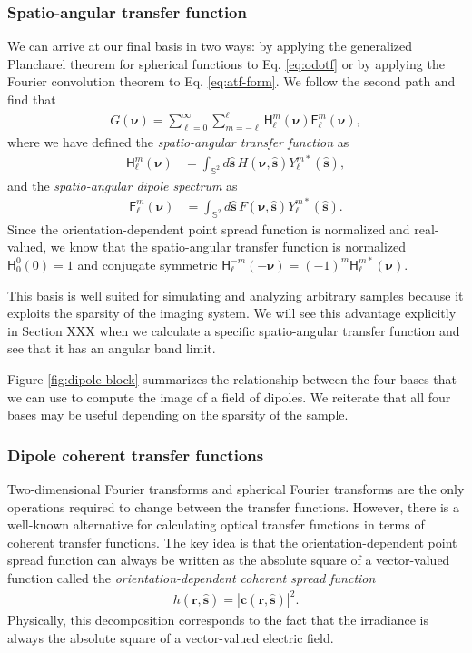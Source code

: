 \documentclass[]{osa-article}
\providecommand{\mb}[1]{\mathbf{#1}}
\providecommand{\msf}[1]{\mathsf{#1}}
\providecommand{\mh}[1]{\mathbf{\hat{#1}}}
\providecommand{\mbb}[1]{\mathbb{#1}}
\providecommand{\bs}[1]{\boldsymbol{#1}}
\providecommand{\lmsum}{\sum_{\ell=0}^\infty\sum_{m=-\ell}^{\ell}}
\begin{document}
\subsubsection{Spatio-angular transfer function}
We can arrive at our final basis in two ways: by applying the generalized
Plancharel theorem for spherical functions to Eq. \ref{eq:odotf} or by applying
the Fourier convolution theorem to Eq. \ref{eq:atf-form}. We follow the
second path and find that
\begin{align}
G(\bs{\nu}) = \lmsum \msf{H}_\ell^m(\bs{\nu})\msf{F}_\ell^m(\bs{\nu}) \label{eq:saft},
\end{align}
where we have defined the \textit{spatio-angular transfer function} as
  \begin{align}
  \msf{H}_\ell^m(\bs{\nu}) &= \int_{\mbb{S}^2}d\mh{s}\, H(\bs{\nu}, \mh{s})Y_\ell^{m*}(\mh{s}),
  \end{align}
  and the \textit{spatio-angular dipole spectrum} as
  \begin{align}
  \msf{F}_\ell^m(\bs{\nu}) &= \int_{\mbb{S}^2}d\mh{s}\, F(\bs{\nu}, \mh{s})Y_\ell^{m*}(\mh{s}).
  \end{align}
  Since the orientation-dependent point spread function is normalized and
  real-valued, we know that the spatio-angular transfer function is normalized
  $\msf{H}_0^0(0) = 1$ and conjugate symmetric
  $\msf{H}_\ell^{-m}(-\bs{\nu}) = (-1)^m\msf{H}_\ell^{m*}(\bs{\nu})$.
  
  This basis is well suited for simulating and analyzing arbitrary samples
  because it exploits the sparsity of the imaging system. We will see this
  advantage explicitly in Section XXX when we calculate a specific
  spatio-angular transfer function and see that it has an angular band limit.

  Figure \ref{fig:dipole-block} summarizes the relationship between the four
  bases that we can use to compute the image of a field of dipoles. We reiterate
  that all four bases may be useful depending on the sparsity of the sample.
    
\subsubsection{Dipole coherent transfer functions}
Two-dimensional Fourier transforms and spherical Fourier transforms are the only
operations required to change between the transfer functions. However, there is
a well-known alternative for calculating optical transfer functions in terms of
coherent transfer functions. The key idea is that the orientation-dependent
point spread function can always be written as the absolute square of a
vector-valued function called the \textit{orientation-dependent coherent spread
  function}
\begin{align}
  h(\mb{r}, \mh{s}) = |\mb{c}(\mb{r}, \mh{s})|^2. \label{eq:absquare}
\end{align}
Physically, this decomposition corresponds to the fact that the irradiance is
always the absolute square of a vector-valued electric field.
\end{document}
